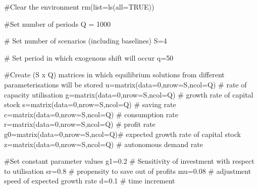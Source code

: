 \documentclass[
  letterpaper,
  DIV=11,
  numbers=noendperiod]{scrreprt}
\newenvironment{Shaded}{\begin{snugshade}}{\end{snugshade}}
\newcommand{\AttributeTok}[1]{\textcolor[rgb]{0.40,0.45,0.13}{#1}}
\newcommand{\CommentTok}[1]{\textcolor[rgb]{0.37,0.37,0.37}{#1}}
\newcommand{\ConstantTok}[1]{\textcolor[rgb]{0.56,0.35,0.01}{#1}}
\newcommand{\DecValTok}[1]{\textcolor[rgb]{0.68,0.00,0.00}{#1}}
\newcommand{\FloatTok}[1]{\textcolor[rgb]{0.68,0.00,0.00}{#1}}
\newcommand{\FunctionTok}[1]{\textcolor[rgb]{0.28,0.35,0.67}{#1}}
\newcommand{\NormalTok}[1]{\textcolor[rgb]{0.00,0.23,0.31}{#1}}
\newcommand{\OtherTok}[1]{\textcolor[rgb]{0.00,0.23,0.31}{#1}}
\begin{document}
\begin{Shaded}
\begin{Highlighting}[]
\CommentTok{\#Clear the environment}
\FunctionTok{rm}\NormalTok{(}\AttributeTok{list=}\FunctionTok{ls}\NormalTok{(}\AttributeTok{all=}\ConstantTok{TRUE}\NormalTok{))}

\CommentTok{\#Set number of periods}
\NormalTok{Q }\OtherTok{=} \DecValTok{1000}

\CommentTok{\# Set number of scenarios (including baselines)}
\NormalTok{S}\OtherTok{=}\DecValTok{4}

\CommentTok{\# Set period in which exogenous shift will occur}
\NormalTok{q}\OtherTok{=}\DecValTok{50}

\CommentTok{\#Create (S x Q) matrices in which equilibrium solutions from different parameterisations will be stored}
\NormalTok{u}\OtherTok{=}\FunctionTok{matrix}\NormalTok{(}\AttributeTok{data=}\DecValTok{0}\NormalTok{,}\AttributeTok{nrow=}\NormalTok{S,}\AttributeTok{ncol=}\NormalTok{Q) }\CommentTok{\# rate of capacity utilisation}
\NormalTok{g}\OtherTok{=}\FunctionTok{matrix}\NormalTok{(}\AttributeTok{data=}\DecValTok{0}\NormalTok{,}\AttributeTok{nrow=}\NormalTok{S,}\AttributeTok{ncol=}\NormalTok{Q) }\CommentTok{\# growth rate of capital stock}
\NormalTok{s}\OtherTok{=}\FunctionTok{matrix}\NormalTok{(}\AttributeTok{data=}\DecValTok{0}\NormalTok{,}\AttributeTok{nrow=}\NormalTok{S,}\AttributeTok{ncol=}\NormalTok{Q) }\CommentTok{\# saving rate}
\NormalTok{c}\OtherTok{=}\FunctionTok{matrix}\NormalTok{(}\AttributeTok{data=}\DecValTok{0}\NormalTok{,}\AttributeTok{nrow=}\NormalTok{S,}\AttributeTok{ncol=}\NormalTok{Q) }\CommentTok{\# consumption rate}
\NormalTok{r}\OtherTok{=}\FunctionTok{matrix}\NormalTok{(}\AttributeTok{data=}\DecValTok{0}\NormalTok{,}\AttributeTok{nrow=}\NormalTok{S,}\AttributeTok{ncol=}\NormalTok{Q) }\CommentTok{\# profit rate}
\NormalTok{g0}\OtherTok{=}\FunctionTok{matrix}\NormalTok{(}\AttributeTok{data=}\DecValTok{0}\NormalTok{,}\AttributeTok{nrow=}\NormalTok{S,}\AttributeTok{ncol=}\NormalTok{Q)}\CommentTok{\# expected growth rate of capital stock}
\NormalTok{z}\OtherTok{=}\FunctionTok{matrix}\NormalTok{(}\AttributeTok{data=}\DecValTok{0}\NormalTok{,}\AttributeTok{nrow=}\NormalTok{S,}\AttributeTok{ncol=}\NormalTok{Q) }\CommentTok{\# autonomous demand rate}

\CommentTok{\#Set constant parameter values}
\NormalTok{g1}\OtherTok{=}\FloatTok{0.2}  \CommentTok{\# Sensitivity of investment with respect to utilisation}
\NormalTok{sr}\OtherTok{=}\FloatTok{0.8}  \CommentTok{\# propensity to save out of profits}
\NormalTok{mu}\OtherTok{=}\FloatTok{0.08} \CommentTok{\# adjustment speed of expected growth rate}
\NormalTok{d}\OtherTok{=}\FloatTok{0.1}   \CommentTok{\# time increment}


\end{Highlighting}
\end{Shaded}
\end{document}
